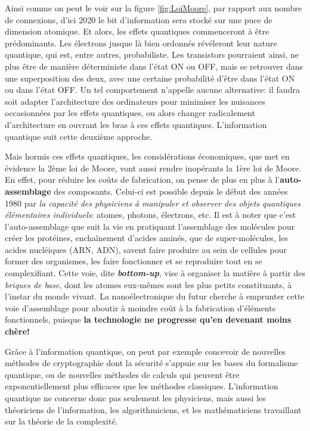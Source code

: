 \documentclass[12pt,a4paper,oneside,openany]{book}%
\numberwithin{equation}{section}
\numberwithin{figure}{section}
\numberwithin{table}{section}
\begin{document}
Ainsi comme on peut le voir sur la figure \ref{fig:LoiMoore}, par rapport aux
nombre de connexions, d'ici 2020 le bit d'information sera stocké sur une puce
de dimension atomique. Et alors, les effets quantiques commenceront à être
prédominants. Les électrons jusque là bien ordonnés révéleront leur nature
quantique, qui est, entre autres, probabiliste. Les transistors pourraient
ainsi, ne plus être de manière déterministe dans l'état ON ou OFF, mais se
retrouver dans une superposition des deux, avec une certaine probabilité d'être
dans l'état ON ou dans l'état OFF. Un tel comportement n'appelle aucune
alternative: il faudra soit adapter l'architecture des ordinateurs pour
minimiser les nuisances occasionnées par les effets quantiques, ou alors changer
radicalement d'architecture en ouvrant les bras à ces effets quantiques.
L'information quantique suit cette deuxième approche.

Mais hormis ces effets quantiques, les considérations économiques, que met en
évidence la 2ème loi de Moore, vont aussi rendre inopérants la 1ère loi de
Moore. En effet, pour réduire les coûts de fabrication, on pense de plus en plus
à l'\textbf{auto-assemblage} des composants. Celui-ci est possible depuis le
début des années 1980 par \emph{la capacité des physiciens à manipuler et
observer des objets quantiques élémentaires individuels}: atomes, photons,
électrons, etc. Il est à noter que c'est l'auto-assemblage que suit la vie en
pratiquant l'assemblage des molécules pour créer les protéines, enchaînement
d'acides aminés, que de super-molécules, les acides nucléiques (ARN, ADN),
savent faire produire au sein de cellules pour former des organismes, les faire
fonctionner et se reproduire tout en se complexifiant. Cette voie, dite
\emph{\textbf{bottom-up}}, vise à organiser la matière à partir des
\emph{briques de base}, dont les atomes eux-mêmes sont les plus petits
constituants, à l'instar du monde vivant. La nanoélectronique du futur cherche à
emprunter cette voie d'assemblage pour aboutir à moindre coût à la fabrication
d'éléments fonctionnels, puisque \textbf{la technologie ne progresse qu'en
devenant moins chère!}

Grâce à l'information quantique, on peut par exemple concevoir de nouvelles
méthodes de cryptographie dont la sécurité s'appuie sur les bases du formalisme
quantique, ou de nouvelles méthodes de calculs qui peuvent être 
exponentiellement plus efficaces que les méthodes classiques. L'information
quantique ne concerne donc pas seulement les physiciens, mais aussi les
théoriciens de l'information, les algorithmiciens, et les mathématiciens
travaillant sur la théorie de la complexité.
\end{document}

